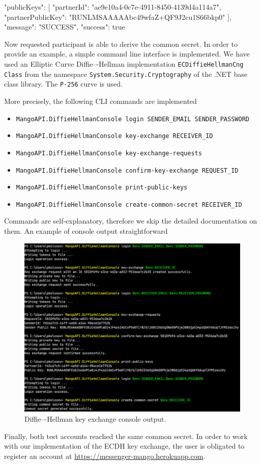 \begin{spverbatim}
{
    "publicKeys": [
        {
            "partnerId": "ae9e10a4-0c7e-4911-8450-4139d4a114a7",
            "partnerPublicKey": "RUNLMSAAAAAbc49wfaZ+QF9J2cu1S66bkp0"
        }
    ],
    "message": "SUCCESS",
    "success": true
}
\end{spverbatim}
Now requested participant is able to derive the common secret.
In order to provide an example, a simple command line interface is implemented.
We have used an Elliptic Curve Diffie–-Hellman implementation \texttt{ECDiffieHellmanCng Class} from the namespace
\texttt{System.Security.Cryptography} of the .NET base class library.
The \texttt{P-256} curve is used.

More precisely, the following CLI commands are implemented
\begin{itemize}
    \item \texttt{MangoAPI.DiffieHellmanConsole login SENDER\_EMAIL SENDER\_PASSWORD}
    \item \texttt{MangoAPI.DiffieHellmanConsole key-exchange RECEIVER\_ID}
    \item \texttt{MangoAPI.DiffieHellmanConsole key-exchange-requests}
    \item \texttt{MangoAPI.DiffieHellmanConsole confirm-key-exchange REQUEST\_ID}
    \item \texttt{MangoAPI.DiffieHellmanConsole print-public-keys}
    \item \texttt{MangoAPI.DiffieHellmanConsole create-common-secret RECEIVER\_ID}
\end{itemize}
Commands are self-explanatory, therefore we skip the detailed documentation on them.
An example of console output straightforward
\begin{figure}[H]
    \centering
    \includegraphics[width=1\textwidth]{Pictures/KeyExhangeConsole2}
    \caption{Diffie–-Hellman key exchange console output.}\label{fig:figure7}
\end{figure}
Finally, both test accounts reached the same common secret.
In order to work with our implementation of the ECDH key exchange, the user is obligated to register an account
at \href{https://messenger-mango.herokuapp.com}{https://messenger-mango.herokuapp.com}.